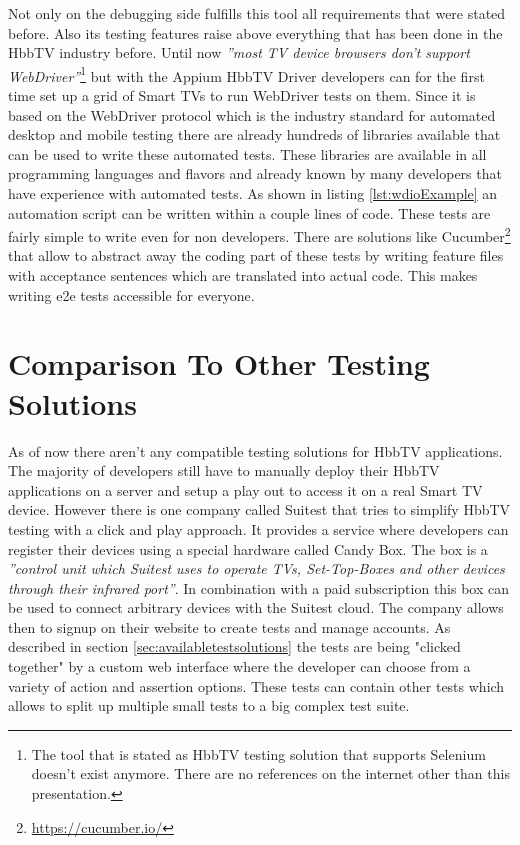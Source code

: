 Not only on the debugging side fulfills this tool all requirements that were stated before. Also its testing features raise above everything that has been done in the HbbTV industry before. Until now \textit{''most TV device browsers don’t support WebDriver''}\cite{sengo}\footnote{The tool that is stated as HbbTV testing solution that supports Selenium doesn't exist anymore. There are no references on the internet other than this presentation.} but with the Appium HbbTV Driver developers can for the first time set up a grid of Smart TVs to run WebDriver tests on them. Since it is based on the WebDriver protocol which is the industry standard for automated desktop and mobile testing there are already hundreds of libraries available that can be used to write these automated tests. These libraries are available in all programming languages and flavors and already known by many developers that have experience with automated tests. As shown in listing \ref{lst:wdioExample} an automation script can be written within a couple lines of code. These tests are fairly simple to write even for non developers. There are solutions like Cucumber\footnote{\url{https://cucumber.io/}} that allow to abstract away the coding part of these tests by writing feature files with acceptance sentences which are translated into actual code. This makes writing e2e tests accessible for everyone.

\section{Comparison To Other Testing Solutions\label{sec:businessmodel}}

As of now there aren't any compatible testing solutions for HbbTV applications. The majority of developers still have to manually deploy their HbbTV applications on a server and setup a play out to access it on a real Smart TV device. However there is one company called Suitest that tries to simplify HbbTV testing with a click and play approach. It provides a service where developers can register their devices using a special hardware called Candy Box. The box is a \textit{''control unit which Suitest uses to operate TVs, Set-Top-Boxes and other devices through their infrared port''}\cite{candybox}. In combination with a paid subscription this box can be used to connect arbitrary devices with the Suitest cloud. The company allows then to signup on their website to create tests and manage accounts. As described in section \ref{sec:availabletestsolutions} the tests are being "clicked together" by a custom web interface where the developer can choose from a variety of action and assertion options. These tests can contain other tests which allows to split up multiple small tests to a big complex test suite.

